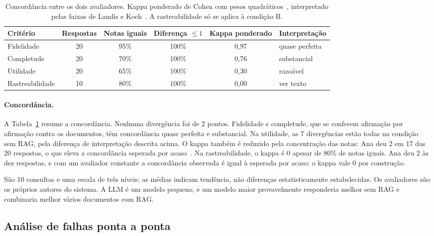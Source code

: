 \documentclass[11pt,a4paper]{article}
\begin{document}
\begin{table}[!htb]
\centering\small
\caption{Concordância entre os dois avaliadores. Kappa ponderado de Cohen com pesos quadráticos~\cite{cohen1968}, interpretado pelas faixas de Landis e Koch~\cite{landis1977}. A rastreabilidade só se aplica à condição B.}
\label{tab:concordancia}
\begin{tabular}{lccccl}
\toprule
Critério & Respostas & Notas iguais & Diferença $\le 1$ & Kappa ponderado & Interpretação \\
\midrule
Fidelidade & 20 & 95\% & 100\% & 0,97 & quase perfeita \\
Completude & 20 & 70\% & 100\% & 0,76 & substancial \\
Utilidade & 20 & 65\% & 100\% & 0,30 & razoável \\
Rastreabilidade & 10 & 80\% & 100\% & 0,00 & ver texto \\
\bottomrule
\end{tabular}
\end{table}

\paragraph{Concordância.} A Tabela~\ref{tab:concordancia} resume a concordância. Nenhuma divergência foi de 2 pontos. Fidelidade e completude, que se conferem afirmação por afirmação contra os documentos, têm concordância quase perfeita e substancial. Na utilidade, as 7 divergências estão todas na condição sem RAG, pela diferença de interpretação descrita acima. O kappa também é reduzido pela concentração das notas: Ana deu 2 em 17 das 20 respostas, o que eleva a concordância esperada por acaso~\cite{feinstein1990}. Na rastreabilidade, o kappa é 0 apesar de 80\% de notas iguais. Ana deu 2 às dez respostas, e com um avaliador constante a concordância observada é igual à esperada por acaso: o kappa vale 0 por construção.

São 10 consultas e uma escala de três níveis: as médias indicam tendência, não diferenças estatisticamente estabelecidas. Os avaliadores são os próprios autores do sistema. A LLM é um modelo pequeno, e um modelo maior provavelmente responderia melhor sem RAG e combinaria melhor vários documentos com RAG.

\FloatBarrier
\subsection{Análise de falhas ponta a ponta}
\end{document}
